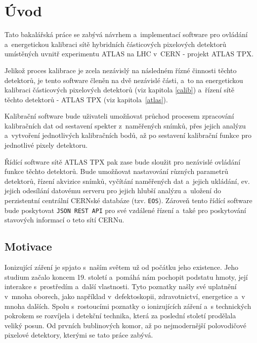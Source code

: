 

\chapter{Úvod}\label{chap01}
Tato bakalářská práce se zabývá návrhem a~implementací software pro ovládání a~energetickou kalibraci sítě hybridních částicových pixelových detektorů umístěných uvnitř experimentu ATLAS na LHC v~CERN - projekt ATLAS TPX. 

Jelikož proces kalibrace je zcela nezávislý na následném řízné činnosti těchto detektorů, je tento software členěn na dvě nezávislé části, a~to na energetickou kalibraci částicových pixelových detektorů (viz kapitola \ref{calib}) a~řízení sítě těchto detektorů - ATLAS TPX (viz kapitola~\ref{atlas}).

Kalibrační software bude uživateli umožňovat průchod procesem zpracování kalibračních dat od sestavení spekter z~naměřených snímků, přes jejich analýzu a~vytvoření jednotlivých kalibračních bodů, až po sestavení kalibrační funkce pro jednotlivé pixely detektoru.

Řídící software sítě ATLAS TPX pak zase bude sloužit pro nezávislé ovládání funkce těchto detektorů. Bude umožňovat nastavování různých parametrů detektorů, řízení akvizice snímků, vyčítání naměřených dat a~jejich ukládání, ev. jejich odesílání datovému serveru pro jejich hlubší analýzu a~uložení do perzistentní centrální CERNské databáze (tzv. \texttt{EOS}). Zároveň tento řídící software bude poskytovat \texttt{JSON REST API} pro své vzdálené řízení a~také pro poskytování stavových informací o teto sítí CERNu.

\section{Motivace}
Ionizující záření je spjato s~naším světem už od počátku jeho existence. Jeho studium začalo koncem 19. století a~pomáhá nám pochopit podstatu hmoty, její interakce s~prostředím a~další vlastnosti. Tyto poznatky našly své uplatnění v~mnoha oborech, jako například v~defektoskopii, zdravotnictví, energetice a~v mnoha dalších. Spolu s~rostoucími poznatky o ionizujících záření a~s technických pokrokem se rozvíjela i detekční technika, která za poslední století prodělala veliký posun. Od prvních bublinových komor, až po nejmodernější polovodičové pixelové detektory, kterými se tato práce zabývá. 



